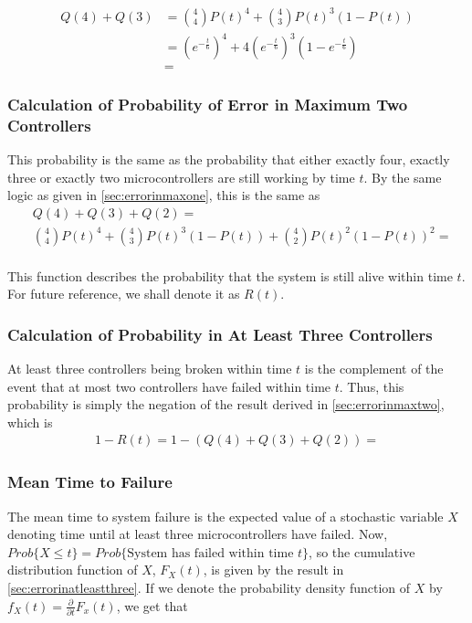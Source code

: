 \begin{align*}
    Q(4) + Q(3) &= \binom{4}{4}P(t)^4 + \binom{4}{3}P(t)^3(1 - P(t)) \\
                &= (e^{-\frac{t}{6}})^4  + 4 (e^{-\frac{t}{6}})^3(1 - e^{-\frac{t}{6}}) \\
                &= 
\end{align*}

\subsubsection{Calculation of Probability of Error in Maximum Two Controllers}
\label{sec:errorinmaxtwo}
This probability is the same as the probability that either exactly
four, exactly three or exactly two microcontrollers are still working
by time $t$. By the same logic as given in
\autoref{sec:errorinmaxone}, this is the same as
\begin{align*}
  &Q(4) + Q(3) + Q(2) = \\
  &\binom{4}{4}P(t)^4 + \binom{4}{3}P(t)^3(1 - P(t)) + \binom{4}{2}P(t)^2(1 - P(t))^2 = \\
  &
\end{align*}

This function describes the probability that the system is still alive
within time $t$. For future reference, we shall denote it as $R(t)$.

\subsubsection{Calculation of Probability in At Least Three Controllers}
\label{sec:errorinatleastthree}
At least three controllers being broken within time $t$ is the
complement of the event that at most two controllers have failed
within time $t$. Thus, this probability is simply the negation of the
result derived in \autoref{sec:errorinmaxtwo}, which is
\begin{align*}
  1 - R(t) = 1 - (Q(4) + Q(3) + Q(2)) = 
\end{align*}

\subsubsection{Mean Time to Failure}
The mean time to system failure is the expected value of a stochastic
variable $X$ denoting time until at least three microcontrollers have
failed. Now, $Prob\{X \le t\} = Prob\{\text{System has failed within
  time } t\}$, so the cumulative distribution function of $X$,
$F_X(t)$, is given by the result in
\autoref{sec:errorinatleastthree}. If we denote the probability
density function of $X$ by $f_X(t) = \frac{\partial}{\partial
  t}F_x(t)$, we get that

